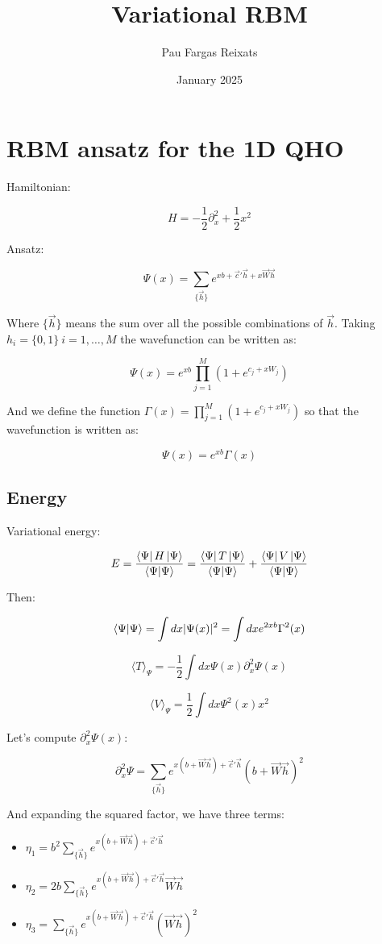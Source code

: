 \documentclass{book}
\title{Variational RBM}
\author{Pau Fargas Reixats}
\date{January 2025}
\begin{document}
\maketitle

\chapter{RBM ansatz for the 1D QHO}

Hamiltonian:

\[H=-\frac{1}{2}\partial_x^2+\frac{1}{2}x^2\]

Ansatz:

\[\Psi(x)=\sum_{\{\vec{h}\}}e^{xb+\vec{c}'\vec{h}+x\vec{W}\vec{h}}\]

Where $\{\vec{h}\}$ means the sum over all the possible combinations of $\vec{h}$. Taking $h_i=\{0,1\}\ i = 1,\dots, M$ the wavefunction can be written as:

\[\Psi(x)=e^{xb}\prod_{j=1}^M(1+e^{c_j+xW_j})\]

And we define the function $\Gamma(x)=\prod_{j=1}^M(1+e^{c_j+xW_j})$ so that the wavefunction is written as:

\[\Psi(x)=e^{xb}\Gamma(x)\]

\section{Energy}

Variational energy:

\[E=\frac{\bra{\Psi}H\ket{\Psi}}{\bra{\Psi}\ket{\Psi}}=\frac{\bra{\Psi}T\ket{\Psi}}{\bra{\Psi}\ket{\Psi}}+\frac{\bra{\Psi}V\ket{\Psi}}{\bra{\Psi}\ket{\Psi}}\]

Then:

\[\braket{\Psi}{\Psi}=\int dx |\Psi(x)|^2=\int dx e^{2xb}\Gamma^2(x)\]

\[\langle{T}\rangle_\Psi=-\frac12\int dx \Psi(x)\partial^2_x\Psi(x)\]

\[\langle{V}\rangle_\Psi=\frac12\int dx \Psi^2(x)x^2\]

Let's compute $\partial^2_x\Psi(x)$:

\[\partial_x ^2\Psi = \sum_{\{\vec{h}\}}e^{x(b+\vec{W}\vec{h})+\vec{c}'\vec{h}}(b+\vec{W}\vec{h})^2\]

And expanding the squared factor, we have three terms:

\begin{itemize}
    \item $\eta_1=b^2\sum_{\{\vec{h}\}}e^{x(b+\vec{W}\vec{h})+\vec{c}'\vec{h}}$
    \item $\eta_2=2b\sum_{\{\vec{h}\}}e^{x(b+\vec{W}\vec{h})+\vec{c}'\vec{h}}\vec{W}\vec{h}$
    \item $\eta_3=\sum_{\{\vec{h}\}}e^{x(b+\vec{W}\vec{h})+\vec{c}'\vec{h}}(\vec{W}\vec{h})^2$
\end{itemize}
\end{document}
